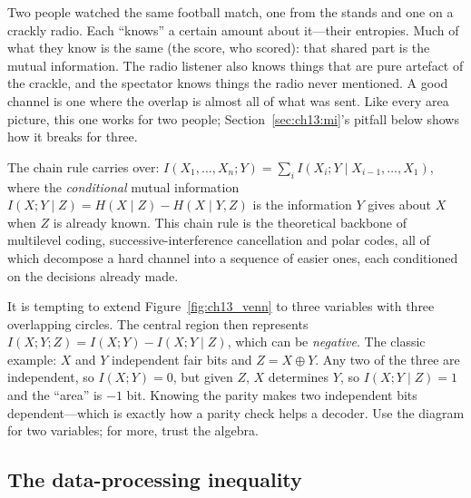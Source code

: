\par\vspace{0pt plus 8\baselineskip}\vspace{0pt plus -8\baselineskip}
\begin{analogy}
Two people watched the same football match, one from the stands and one on a crackly radio. Each
``knows'' a certain amount about it---their entropies. Much of what they know is the same (the
score, who scored): that shared part is the mutual information. The radio listener also knows
things that are pure artefact of the crackle, and the spectator knows things the radio never
mentioned. A good channel is one where the overlap is almost all of what was sent. Like every
area picture, this one works for two people; Section~\ref{sec:ch13:mi}'s pitfall below shows how it
breaks for three.
\end{analogy}

The chain rule carries over: $I(X_1,\ldots,X_n;Y)=\sum_iI(X_i;Y\mid X_{i-1},\ldots,X_1)$, where the
\emph{conditional} mutual information $I(X;Y\mid Z)=H(X\mid Z)-H(X\mid Y,Z)$ is the information
$Y$ gives about $X$ when $Z$ is already known. This chain rule is the theoretical backbone of
multilevel coding, successive-interference cancellation and polar codes, all of which decompose a
hard channel into a sequence of easier ones, each conditioned on the decisions already made.

\begin{pitfall}
It is tempting to extend Figure~\ref{fig:ch13_venn} to three variables with three overlapping
circles. The central region then represents $I(X;Y;Z)=I(X;Y)-I(X;Y\mid Z)$, which can be
\emph{negative}. The classic example: $X$ and $Y$ independent fair bits and $Z=X\oplus Y$. Any two
of the three are independent, so $I(X;Y)=0$, but given $Z$, $X$ determines $Y$, so
$I(X;Y\mid Z)=1$ and the ``area'' is $-1$ bit. Knowing the parity makes two independent bits
dependent---which is exactly how a parity check helps a decoder. Use the diagram for two
variables; for more, trust the algebra.
\end{pitfall}


\subsection{The data-processing inequality}

